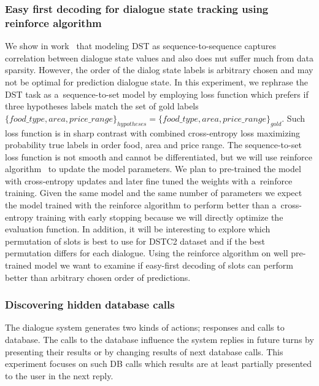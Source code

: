 \documentclass[11pt]{article}
\begin{document}
\subsubsection*{Easy first decoding for dialogue state tracking using reinforce algorithm}
We show in work~\cite{platek_recurrent_2016} that modeling DST as sequence-to-sequence captures correlation between dialogue state values and also does nut suffer much from data sparsity.
However, the order of the dialog state labels is arbitrary chosen and may not be optimal for prediction dialogue state.
In this experiment, we rephrase the DST task as a~sequence-to-set model by employing loss function which prefers if three hypotheses labels match the set of gold labels $\{food\_type, area, price\_range\}_{hypotheses} = \{food\_type, area, price\_range\}_{gold}$.
Such loss function is in sharp contrast with combined cross-entropy loss maximizing probability true labels in order food, area and price range.
The sequence-to-set loss function is not smooth and cannot be differentiated, but we will use reinforce algorithm~\cite{williams_simple_1992} to update the model parameters.
We plan to pre-trained the model with cross-entropy updates and later fine tuned the weights with a~reinforce training.
Given the same model and the same number of parameters we expect the model trained with the reinforce algorithm to perform better than a~cross-entropy training with early stopping because we will directly optimize the evaluation function.
In addition, it will be interesting to explore which permutation of slots is best to use for DSTC2 dataset and if the best permutation differs for each dialogue.
Using the reinforce algorithm on well pre-trained model we want to examine if easy-first decoding of slots can perform better than arbitrary chosen order of predictions. 

\subsubsection*{Discovering hidden database calls}
The dialogue system generates two kinds of actions; responses and calls to database.
The calls to the database influence the system replies in future turns by presenting their results or by changing results of next database calls.
This experiment focuses on such DB calls which results are at least partially presented to the user in the next reply.
\end{document}
